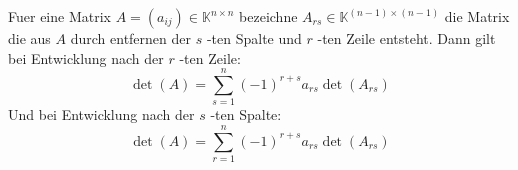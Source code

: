 Fuer eine Matrix $A = (a_{ij}) \in \mathbb{K}^{n \times n}$ bezeichne $A_{rs} \in \mathbb{K}^{(n-1) \times (n-1)}$ die Matrix die aus $A$ durch entfernen der $s$ -ten Spalte und $r$ -ten Zeile entsteht. Dann gilt bei Entwicklung nach der $r$ -ten Zeile:
$$\det(A) = \sum\limits_{s =1}^{n} (-1)^{r + s} a_{rs} \det(A_{rs})$$ 
Und bei Entwicklung nach der $s$ -ten Spalte:
$$\det(A) = \sum\limits_{r =1}^{n} (-1)^{r + s} a_{rs} \det(A_{rs})$$ 
